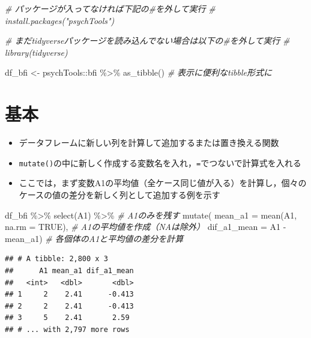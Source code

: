 \documentclass[
  xelatex,ja=standard, b5paper]{bxjsbook}
\newenvironment{Shaded}{\begin{snugshade}}{\end{snugshade}}
\newcommand{\AttributeTok}[1]{\textcolor[rgb]{0.77,0.63,0.00}{#1}}
\newcommand{\CommentTok}[1]{\textcolor[rgb]{0.56,0.35,0.01}{\textit{#1}}}
\newcommand{\ConstantTok}[1]{\textcolor[rgb]{0.00,0.00,0.00}{#1}}
\newcommand{\FunctionTok}[1]{\textcolor[rgb]{0.00,0.00,0.00}{#1}}
\newcommand{\NormalTok}[1]{#1}
\newcommand{\OtherTok}[1]{\textcolor[rgb]{0.56,0.35,0.01}{#1}}
\newcommand{\SpecialCharTok}[1]{\textcolor[rgb]{0.00,0.00,0.00}{#1}}
\providecommand{\tightlist}{%
  \setlength{\itemsep}{0pt}\setlength{\parskip}{0pt}}
\begin{document}
\begin{Shaded}
\begin{Highlighting}[]
\CommentTok{\# パッケージが入ってなければ下記の\#を外して実行}
\CommentTok{\# install.packages("psychTools")}

\CommentTok{\# まだtidyverseパッケージを読み込んでない場合は以下の\#を外して実行}
\CommentTok{\# library(tidyverse)}

\NormalTok{df\_bfi }\OtherTok{\textless{}{-}} 
\NormalTok{  psychTools}\SpecialCharTok{::}\NormalTok{bfi }\SpecialCharTok{\%\textgreater{}\%} 
  \FunctionTok{as\_tibble}\NormalTok{()         }\CommentTok{\# 表示に便利なtibble形式に}
\end{Highlighting}
\end{Shaded}

\hypertarget{mu-standard}{%
\section{基本}\label{mu-standard}}

\begin{itemize}
\tightlist
\item
  データフレームに新しい列を計算して追加するまたは置き換える関数
\item
  \texttt{mutate()}の中に新しく作成する変数名を入れ，\texttt{=}でつないで計算式を入れる
\item
  ここでは，まず変数A1の平均値（全ケース同じ値が入る）を計算し，個々のケースの値の差分を新しく列として追加する例を示す
\end{itemize}

\begin{Shaded}
\begin{Highlighting}[]
\NormalTok{df\_bfi }\SpecialCharTok{\%\textgreater{}\%} 
  \FunctionTok{select}\NormalTok{(A1) }\SpecialCharTok{\%\textgreater{}\%}                      \CommentTok{\# A1のみを残す}
  \FunctionTok{mutate}\NormalTok{(}
    \AttributeTok{mean\_a1 =} \FunctionTok{mean}\NormalTok{(A1, }\AttributeTok{na.rm =} \ConstantTok{TRUE}\NormalTok{), }\CommentTok{\# A1の平均値を作成（NAは除外）}
    \AttributeTok{dif\_a1\_mean =}\NormalTok{ A1 }\SpecialCharTok{{-}}\NormalTok{ mean\_a1)       }\CommentTok{\# 各個体のA1と平均値の差分を計算}
\end{Highlighting}
\end{Shaded}

\begin{verbatim}
## # A tibble: 2,800 x 3
##      A1 mean_a1 dif_a1_mean
##   <int>   <dbl>       <dbl>
## 1     2    2.41      -0.413
## 2     2    2.41      -0.413
## 3     5    2.41       2.59 
## # ... with 2,797 more rows
\end{verbatim}
\end{document}

